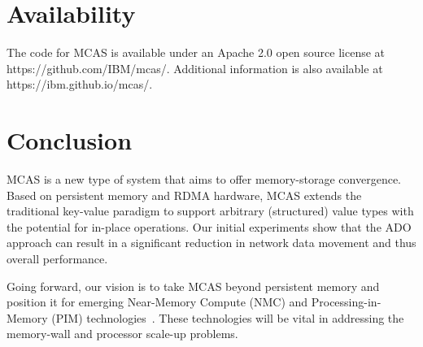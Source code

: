 \documentclass[letterpaper,twocolumn,10pt]{article}
\begin{document}
\section{Availability}

The code for MCAS is available under an Apache 2.0 open source
license at https://github.com/IBM/mcas/.  Additional information is
also available at https://ibm.github.io/mcas/.

\section{Conclusion}

MCAS is a new type of system that aims to offer memory-storage convergence.  Based on
persistent memory and RDMA hardware, MCAS extends the traditional key-value paradigm
to support arbitrary (structured) value types with the potential for in-place operations.
Our initial experiments show that the ADO approach can result in a significant reduction
in network data movement and thus overall performance.


Going forward, our vision is to take MCAS beyond persistent memory and
position it for emerging Near-Memory Compute (NMC) and
Processing-in-Memory (PIM)
technologies~\cite{10.1145/2845084,10.1145/3299874.3317977,10.1145/3307650.3322237,
  10.1145/3036669.3038242, 10.1145/3400302.3415772, 10.1145/2997649}.
These technologies will be vital in addressing the memory-wall and
processor scale-up problems.
 




\end{document}
